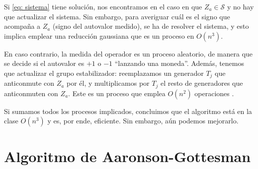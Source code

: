 \documentclass[11pt,a4paper,twoside,pdf]{article}
\numberwithin{equation}{section}
\begin{document}
	
	Si \eqref{eq: sistema} tiene solución, nos encontramos en el caso en que $Z_a\in\mathcal{S}$ y no hay que actualizar el sistema. Sin embargo, para averiguar cuál es el signo que acompaña a $Z_a$ (signo del autovalor medido), se ha de resolver el sistema, y esto implica emplear una reducción gaussiana que es un proceso en $O(n^3)$.
	
	En caso contrario, la medida del operador es un proceso aleatorio, de manera que se decide si el autovalor es $+1$ o $-1$ ``lanzando una moneda''. Además, tenemos que actualizar el grupo estabilizador: reemplazamos un generador $T_j$ que anticonmute con $Z_a$ por él, y multiplicamos por $T_j$ el resto de generadores que anticonmuten con $Z_a$. Este es un proceso que emplea $O(n^2)$ operaciones \cite{Aaronson}.
	
	Si sumamos todos los procesos implicados, concluimos que el algoritmo está en la clase $O(n^3)$ y es, por ende, eficiente. Sin embargo, aún podemos mejorarlo.
		
\newpage		
\section{Algoritmo de Aaronson-Gottesman} \label{sec: AaronsonGottesman}
\end{document}
